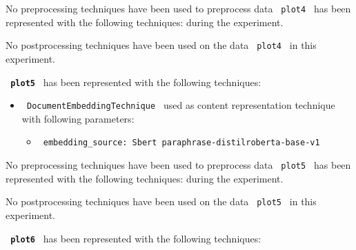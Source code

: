 \documentclass[11pt]{article}
\begin{document}
No preprocessing techniques have been used to preprocess data \lstinline[style=verbatim-text]| plot4 | has been represented with the following techniques:
 during the experiment.
\hfill\break
\hfill\break



No postprocessing techniques have been used on the data \lstinline[style=verbatim-text]| plot4 | in this experiment.
\hfill\break
\hfill\break



\textbf{\lstinline[style=verbatim-text]| plot5 |} has been represented with the following techniques:
\hfill\break
\hfill\break

\begin{itemize}
                                                            
            \item
        \verb| DocumentEmbeddingTechnique | used as content representation technique with following parameters:
        \begin{itemize}
                            \item
                \verb| embedding_source: Sbert paraphrase-distilroberta-base-v1|
                    \end{itemize}
    \end{itemize}
\hfill\break
\hfill\break



No preprocessing techniques have been used to preprocess data \lstinline[style=verbatim-text]| plot5 | has been represented with the following techniques:
 during the experiment.
\hfill\break
\hfill\break



No postprocessing techniques have been used on the data \lstinline[style=verbatim-text]| plot5 | in this experiment.
\hfill\break
\hfill\break



\textbf{\lstinline[style=verbatim-text]| plot6 |} has been represented with the following techniques:
\hfill\break
\hfill\break
\end{document}
